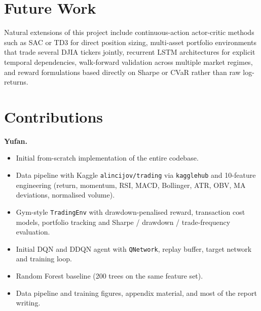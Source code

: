\documentclass[11pt,twocolumn]{article}
\begin{document}
\section{Future Work}

Natural extensions of this project include continuous-action actor-critic methods such as SAC or TD3 for direct position sizing, multi-asset portfolio environments that trade several DJIA tickers jointly, recurrent LSTM architectures for explicit temporal dependencies, walk-forward validation across multiple market regimes, and reward formulations based directly on Sharpe or CVaR rather than raw log-returns.

\section{Contributions}

\noindent\textbf{Yufan.}
\begin{itemize}[leftmargin=*, itemsep=1pt, topsep=2pt]
  \item Initial from-scratch implementation of the entire codebase.
  \item Data pipeline with Kaggle \texttt{alincijov/trading} via \texttt{kagglehub} and 10-feature engineering (return, momentum, RSI, MACD, Bollinger, ATR, OBV, MA deviations, normalised volume).
  \item Gym-style \texttt{TradingEnv} with drawdown-penalised reward, transaction cost models, portfolio tracking and Sharpe / drawdown / trade-frequency evaluation.
  \item Initial DQN and DDQN agent with \texttt{QNetwork}, replay buffer, target network and training loop.
  \item Random Forest baseline (200 trees on the same feature set).
  \item Data pipeline and training figures, appendix material, and most of the report writing.
\end{itemize}
\end{document}

